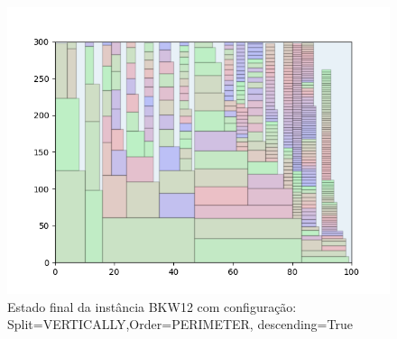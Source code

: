\begin{figure}[H]
    \centering
    \caption[]{Estado final da instância BKW12 com configuração: Split=VERTICALLY,Order=PERIMETER, descending=True}
    \label{fig:bkw12-vertically-perimeter-true}
    \includegraphics[scale=0.5]{output/figures/bkw/bkw12/vertically/perimeter/true/000}
\end{figure}